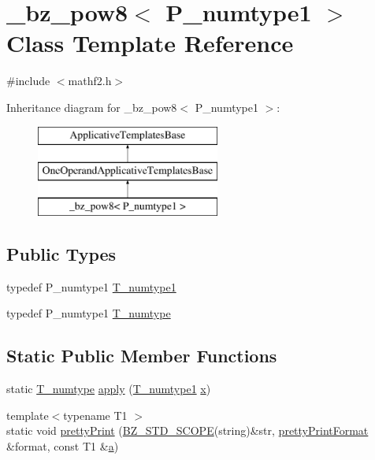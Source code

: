 \hypertarget{class__bz__pow8}{}\section{\+\_\+bz\+\_\+pow8$<$ P\+\_\+numtype1 $>$ Class Template Reference}
\label{class__bz__pow8}


{\ttfamily \#include $<$mathf2.\+h$>$}

Inheritance diagram for \+\_\+bz\+\_\+pow8$<$ P\+\_\+numtype1 $>$\+:\begin{figure}[H]
\begin{center}
\leavevmode
\includegraphics[height=3.000000cm]{class__bz__pow8}
\end{center}
\end{figure}
\subsection*{Public Types}
\begin{DoxyCompactItemize}
\item 
typedef P\+\_\+numtype1 \hyperlink{class__bz__pow8_a0517cae91ca9cb3fcf7d52c7526845dc}{T\+\_\+numtype1}
\item 
typedef P\+\_\+numtype1 \hyperlink{class__bz__pow8_a02e9b5919604a6ca66cd00efb76dfae6}{T\+\_\+numtype}
\end{DoxyCompactItemize}
\subsection*{Static Public Member Functions}
\begin{DoxyCompactItemize}
\item 
static \hyperlink{class__bz__pow8_a02e9b5919604a6ca66cd00efb76dfae6}{T\+\_\+numtype} \hyperlink{class__bz__pow8_af7c7d40758dff0dce9ccf2c162692c16}{apply} (\hyperlink{class__bz__pow8_a0517cae91ca9cb3fcf7d52c7526845dc}{T\+\_\+numtype1} \hyperlink{vecnorm1_8cc_ac73eed9e41ec09d58f112f06c2d6cb63}{x})
\item 
{\footnotesize template$<$typename T1 $>$ }\\static void \hyperlink{class__bz__pow8_a74bbc92503131a7a2e10285e43eef9ec}{pretty\+Print} (\hyperlink{numinquire_8h_a2b24ffc3b4ef9803956bc7715c6c7b83}{B\+Z\+\_\+\+S\+T\+D\+\_\+\+S\+C\+O\+P\+E}(string)\&str, \hyperlink{classprettyPrintFormat}{pretty\+Print\+Format} \&format, const T1 \&\hyperlink{gen__mat5files_8m_aae328bf20413f220e38aec4d95bfd6da}{a})
\end{DoxyCompactItemize}


